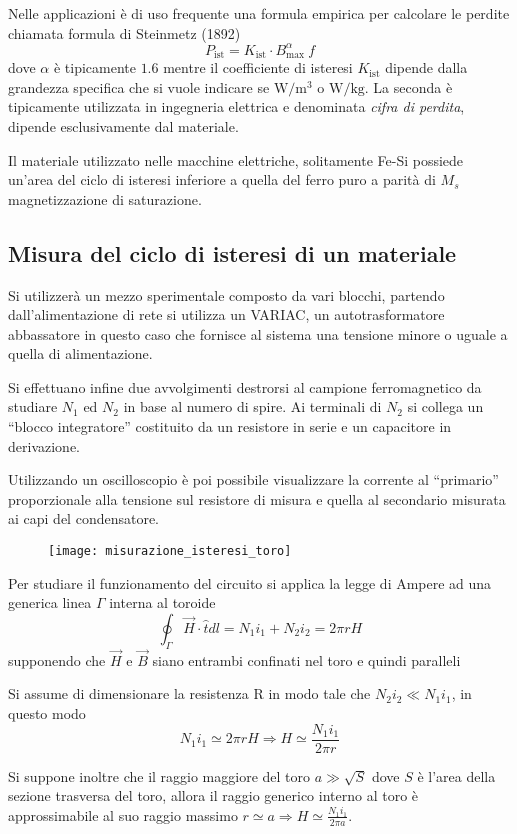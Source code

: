 
Nelle applicazioni è di uso frequente una formula empirica per calcolare le perdite
chiamata formula di Steinmetz (1892)
$$
P_{\text{ist}} = K_\text{ist}\cdot B^\alpha_\text{max}\ f
$$
dove $\alpha$ è tipicamente $1.6$ mentre il coefficiente di isteresi $K_\text{ist}$ dipende
dalla grandezza specifica che si vuole indicare se $\si{\watt\per\meter^3}$ o $\si{\watt\per\kilo\gram}$. La seconda è tipicamente utilizzata in ingegneria elettrica
e denominata \textit{cifra di perdita}, dipende esclusivamente dal materiale.

Il materiale utilizzato nelle macchine elettriche, solitamente Fe-Si possiede 
un'area del ciclo di isteresi inferiore a quella del ferro puro a parità di $M_s$ 
magnetizzazione di saturazione.

\subsection{Misura del ciclo di isteresi di un materiale}
Si utilizzerà un mezzo sperimentale composto da vari blocchi, partendo dall'alimentazione
di rete si utilizza un VARIAC, un autotrasformatore abbassatore in questo caso
che fornisce al sistema una tensione minore o uguale a quella di alimentazione.

Si effettuano infine due avvolgimenti destrorsi al campione ferromagnetico da studiare
$N_1$ ed $N_2$ in base al numero di spire. Ai terminali di $N_2$ si collega un ``blocco
integratore'' costituito da un resistore in serie e un capacitore in derivazione.

Utilizzando un oscilloscopio è poi possibile visualizzare la corrente al ``primario''
proporzionale alla tensione sul resistore di misura e quella al secondario misurata
ai capi del condensatore.
\begin{figure}[H]
\centering
\texttt{[image: misurazione\_isteresi\_toro]}
\end{figure}

Per studiare il funzionamento del circuito si applica la legge di Ampere ad una generica 
linea $\Gamma$ interna al toroide
$$
\oint_\Gamma \vec{H}\cdot\hat{t} dl = N_1 i_1 + N_2 i_2 = 2\pi r H
$$
supponendo che $\vec{H}$ e $\vec{B}$ siano entrambi confinati nel toro e quindi paralleli

Si assume di dimensionare la resistenza R in modo tale che $N_2 i_2 \ll N_1i_1 $, in questo 
modo
$$
N_1 i_1 \simeq 2\pi r H \Rightarrow H \simeq \frac{N_1 i_1}{2 \pi r}
$$

Si suppone inoltre che il raggio maggiore del toro $a\gg \sqrt{S}$ dove $S$ è l'area della
sezione trasversa del toro, allora il raggio generico interno al toro è approssimabile 
al suo raggio massimo $r\simeq a \Rightarrow H\simeq \frac{N_1i_1}{2\pi a}$.


